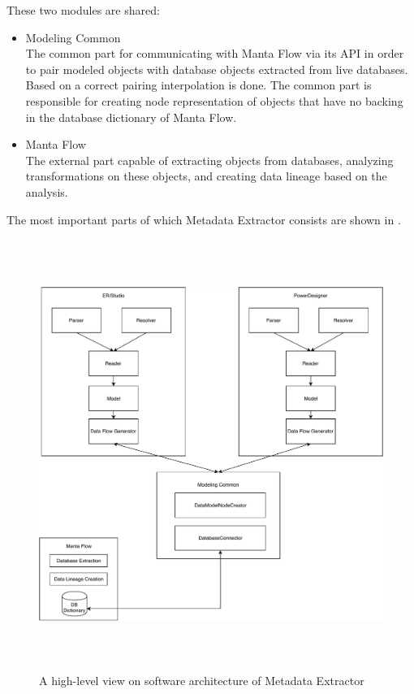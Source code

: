 These two modules are shared:
\begin{itemize}
	\item Modeling Common \\
	The common part for communicating with Manta Flow via its API in order to pair modeled objects with database objects extracted from live databases. Based on a correct pairing interpolation is done. The common part is responsible for creating node representation of objects that have no backing in the database dictionary of Manta Flow.
	\item Manta Flow \\
	The external part capable of extracting objects from databases, analyzing transformations on these objects, and creating data lineage based on the analysis.
\end{itemize}

The most important parts of which Metadata Extractor consists are shown in .

\begin{figure}[H]
	\centering
	\includegraphics[height=14cm]{../img/SWArchitecture}
	\caption[Metadata Extractor Software Architecture]{A high-level view on software architecture of Metadata Extractor}
	\label{SWArchitecture}
\end{figure}